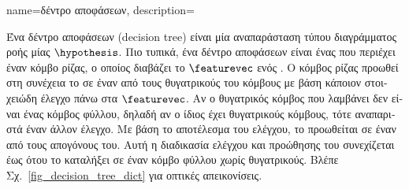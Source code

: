 {name={\foreignlanguage{greek}{δέντρο αποφάσεων}}, 
	description={\foreignlanguage{greek}{Ένα δέντρο αποφάσεων} (decision tree) 
		\foreignlanguage{greek}{είναι μία αναπαράσταση τύπου διαγράμματος ροής μίας}   $\hypothesis$. 
		\foreignlanguage{greek}{Πιο τυπικά, ένα δέντρο αποφάσεων είναι ένας}  \foreignlanguage{greek}{που περιέχει έναν 
		κόμβο ρίζας, ο οποίος διαβάζει το}  $\featurevec$ \foreignlanguage{greek}{ενός} . 
		\foreignlanguage{greek}{Ο κόμβος ρίζας προωθεί στη συνέχεια το}  \foreignlanguage{greek}{σε έναν από τους
		θυγατρικούς του κόμβους με βάση κάποιον στοιχειώδη έλεγχο πάνω στα}  $\featurevec$. \foreignlanguage{greek}{Αν
		ο θυγατρικός κόμβος που λαμβάνει δεν είναι ένας κόμβος φύλλου, δηλαδή αν ο ίδιος έχει θυγατρικούς κόμβους, τότε αναπαριστά
		έναν άλλον έλεγχο. Με βάση το αποτέλεσμα του ελέγχου, το}  \foreignlanguage{greek}{προωθείται σε έναν 
		από τους απογόνους του. Αυτή η διαδικασία ελέγχου και προώθησης του}  \foreignlanguage{greek}{συνεχίζεται 
		έως ότου το}  \foreignlanguage{greek}{καταλήξει σε έναν κόμβο φύλλου χωρίς θυγατρικούς. Βλέπε 
		Σχ.}\ \ref{fig_decision_tree_dict} \foreignlanguage{greek}{για οπτικές απεικονίσεις.}
		\begin{figure}[H]
		\begin{minipage}{.45\textwidth}
\end{minipage}
\end{figure}}}
